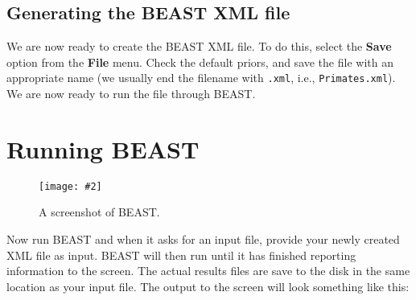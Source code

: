 \documentclass[11pt]{article}
\theoremstyle{plain}%
\theoremstyle{definition}
\theoremstyle{remark}
\newcommand{\includeimage}[2][]{%
\texttt{[image: \#2]}
}
\begin{document}
\subsection{Generating the BEAST XML file }

We are now ready to create the BEAST XML file. To do this,
select the \textbf{Save} option from the \textbf{File} menu. 
Check the default priors, and save the file with an appropriate name
(we usually end the filename with \texttt{.xml}, i.e., \texttt{Primates.xml}).
We are now ready to run the file through BEAST. 

\section{Running BEAST }

\begin{figure}
\centering	
\includeimage[width=0.7\textwidth]{figures/BEAST}
\label{fig:BEAST}
\caption{A screenshot of BEAST.}
\end{figure}

Now run BEAST and when it asks for an input file, provide your newly
created XML file as input. BEAST will then run until it has finished
reporting information to the screen. The actual results files are
save to the disk in the same location as your input file. The output to the screen will
look something like this: 
\end{document}
